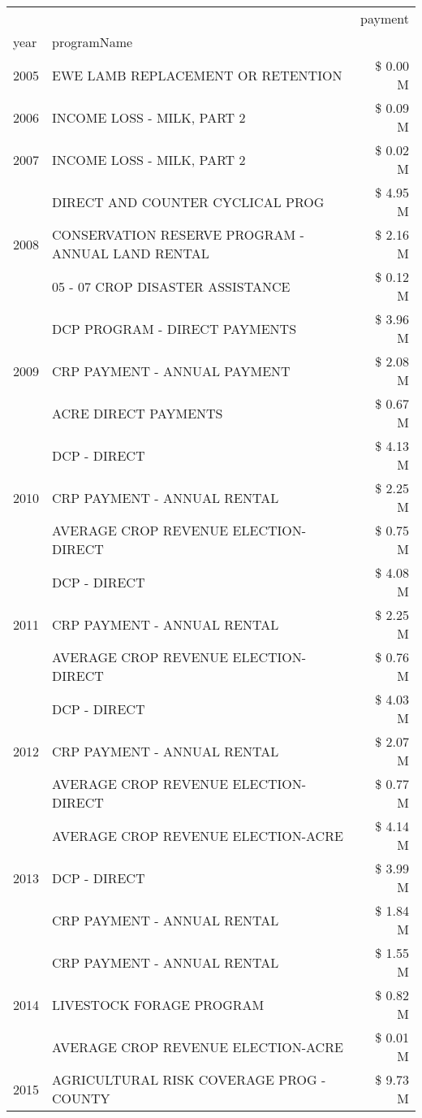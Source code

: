 \begin{tabular}{llr}
\toprule
 &  & payment \\
year & programName &  \\
\midrule
2005 & EWE LAMB REPLACEMENT OR RETENTION & \$ 0.00 M \\
\cline{1-3}
2006 & INCOME LOSS - MILK, PART 2 & \$ 0.09 M \\
\cline{1-3}
2007 & INCOME LOSS - MILK, PART 2 & \$ 0.02 M \\
\cline{1-3}
\multirow[t]{3}{*}{2008} & DIRECT AND COUNTER CYCLICAL PROG & \$ 4.95 M \\
 & CONSERVATION RESERVE PROGRAM - ANNUAL LAND RENTAL & \$ 2.16 M \\
 & 05 - 07 CROP DISASTER ASSISTANCE & \$ 0.12 M \\
\cline{1-3}
\multirow[t]{3}{*}{2009} & DCP PROGRAM - DIRECT PAYMENTS & \$ 3.96 M \\
 & CRP PAYMENT - ANNUAL PAYMENT & \$ 2.08 M \\
 & ACRE DIRECT PAYMENTS & \$ 0.67 M \\
\cline{1-3}
\multirow[t]{3}{*}{2010} & DCP - DIRECT & \$ 4.13 M \\
 & CRP PAYMENT - ANNUAL RENTAL & \$ 2.25 M \\
 & AVERAGE CROP REVENUE ELECTION-DIRECT & \$ 0.75 M \\
\cline{1-3}
\multirow[t]{3}{*}{2011} & DCP - DIRECT & \$ 4.08 M \\
 & CRP PAYMENT - ANNUAL RENTAL & \$ 2.25 M \\
 & AVERAGE CROP REVENUE ELECTION-DIRECT & \$ 0.76 M \\
\cline{1-3}
\multirow[t]{3}{*}{2012} & DCP - DIRECT & \$ 4.03 M \\
 & CRP PAYMENT - ANNUAL RENTAL & \$ 2.07 M \\
 & AVERAGE CROP REVENUE ELECTION-DIRECT & \$ 0.77 M \\
\cline{1-3}
\multirow[t]{3}{*}{2013} & AVERAGE CROP REVENUE ELECTION-ACRE & \$ 4.14 M \\
 & DCP - DIRECT & \$ 3.99 M \\
 & CRP PAYMENT - ANNUAL RENTAL & \$ 1.84 M \\
\cline{1-3}
\multirow[t]{3}{*}{2014} & CRP PAYMENT - ANNUAL RENTAL & \$ 1.55 M \\
 & LIVESTOCK FORAGE PROGRAM & \$ 0.82 M \\
 & AVERAGE CROP REVENUE ELECTION-ACRE & \$ 0.01 M \\
\cline{1-3}
\multirow[t]{3}{*}{2015} & AGRICULTURAL RISK COVERAGE PROG - COUNTY & \$ 9.73 M \\

\end{tabular}
